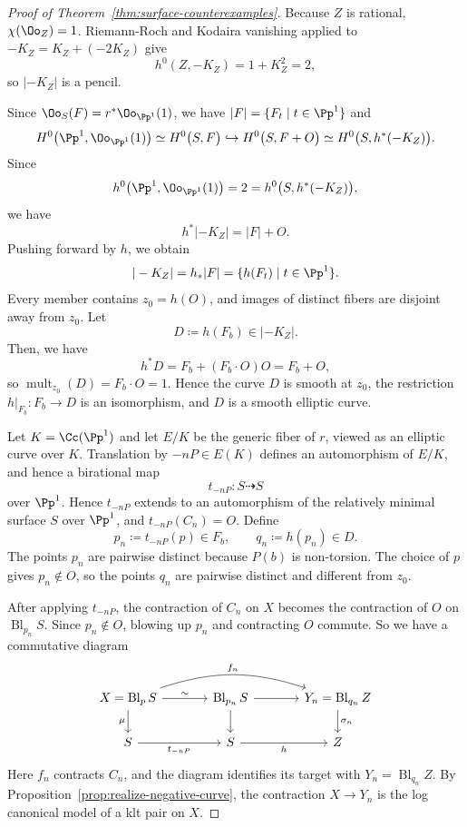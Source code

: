 \documentclass[12pt]{amsart}
\begin{document}
\begin{proof}[Proof of Theorem~\ref{thm:surface-counterexamples}]
Because $Z$ is rational, $\chi(\Oo_Z)=1$. Riemann-Roch and Kodaira vanishing applied to $-K_Z=K_Z+(-2K_Z)$ give
\[
h^0(Z,-K_Z)=1+K_Z^2=2,
\]
so \( |-K_Z| \) is a pencil. 

Since $\Oo_S(F)=r^*\Oo_{\Pp^1}(1)$, we have $|F|=\{F_t\mid t\in\Pp^1\}$ and
\[
H^0\bigl(\Pp^1,\Oo_{\Pp^1}(1)\bigr)
\simeq H^0\bigl(S,F\bigr)
\hookrightarrow H^0\bigl(S,F+O\bigr)
\simeq H^0\bigl(S,h^*(-K_Z)\bigr).
\]
Since
\[
h^0\bigl(\Pp^1,\Oo_{\Pp^1}(1)\bigr)
=2
=h^0\bigl(S,h^*(-K_Z)\bigr),
\]
we have
\[
h^*|-K_Z|
=|F|+O.
\]
Pushing forward by $h$, we obtain
\[
|-K_Z|=h_*|F|=\{h(F_t)\mid t\in\Pp^1\}.
\]
Every member contains $z_0=h(O)$, and images of distinct fibers are disjoint away
from $z_0$. 
Let
\[
 D\coloneqq h(F_b)\in|-K_Z|.
\]
Then, we have
\[
 h^*D=F_b+(F_b\cdot O)O=F_b+O,
\]
so $\operatorname{mult}_{z_0}(D)=F_b\cdot O=1$. Hence the curve $D$ is
smooth at $z_0$, the restriction $h|_{F_b}\colon F_b\to D$ is an isomorphism, and
$D$ is a smooth elliptic curve. 

Let \(K=\Cc(\Pp^1)\) and let \(E/K\) be the generic fiber of \(r\),
viewed as an elliptic curve over \(K\). Translation by
\(-nP\in E(K)\) defines an automorphism of \(E/K\), and hence a
birational map
\[
t_{-nP}\colon S\dashrightarrow S
\]
over \(\Pp^1\). Hence \(t_{-nP}\) extends to an automorphism of the relatively minimal surface $S$ over $\Pp^1$, and \(t_{-nP}(C_n)=O\). Define
\[
 p_n\coloneqq t_{-nP}(p)\in F_b,
 \qquad
 q_n\coloneqq h(p_n)\in D.
\]
The points \(p_n\) are pairwise distinct because \(P(b)\) is
non-torsion. The choice of \(p\) gives \(p_n\notin O\), so the points
\(q_n\) are pairwise distinct and different from \(z_0\).

After applying $t_{-nP}$, the contraction of $C_n$ on $X$ becomes the contraction of $O$ on $\operatorname{Bl}_{p_n}S$. Since $p_n\notin O$, blowing up $p_n$ and contracting $O$ commute. So we have a commutative diagram
\[
\begin{tikzcd}[column sep=large]
 X=\operatorname{Bl}_pS
   \arrow[r,"\sim"]
   \arrow[d,"\mu"']
   \arrow[rr,bend left=18,"f_n"]
 & \operatorname{Bl}_{p_n}S
   \arrow[r]
   \arrow[d]
 & Y_n=\operatorname{Bl}_{q_n}Z
   \arrow[d,"\sigma_n"] \\
 S
   \arrow[r,"t_{-nP}"']
 & S
   \arrow[r,"h"']
 & Z
\end{tikzcd}
\]
Here $f_n$ contracts $C_n$, and the diagram identifies its target with $Y_n=\operatorname{Bl}_{q_n}Z$.
By Proposition~\ref{prop:realize-negative-curve}, the contraction
\(X\to Y_n\) is the log canonical model of a klt pair on \(X\).


\end{proof}
\end{document}
